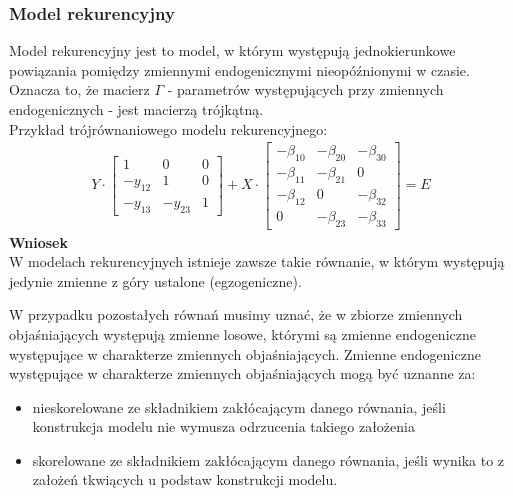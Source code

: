 \subsubsection{Model rekurencyjny}
Model rekurencyjny jest to model, w którym występują jednokierunkowe powiązania pomiędzy zmiennymi endogenicznymi nieopóźnionymi w czasie. Oznacza to, że macierz $ \Gamma $ - parametrów występujących przy zmiennych endogenicznych - jest macierzą trójkątną.\\
Przykład trójrównaniowego modelu rekurencyjnego:
\begin{gather*}
Y\cdot
\begin{bmatrix}
	1       & 0       & 0 \\
	-y_{12} & 1       & 0 \\
	-y_{13} & -y_{23} & 1
\end{bmatrix}
+
X\cdot
\begin{bmatrix}
	-\beta _{10} & -\beta _{20} & -\beta _{30} \\
	-\beta _{11} & -\beta _{21} & 0            \\
	-\beta _{12} & 0            & -\beta _{32} \\
	0            & -\beta _{23} & -\beta _{33}
\end{bmatrix}
=E
\end{gather*}
\textbf{Wniosek}\\
W modelach rekurencyjnych istnieje zawsze takie równanie, w którym występują jedynie zmienne z góry ustalone (egzogeniczne).

W przypadku pozostałych równań musimy uznać, że w zbiorze zmiennych objaśniających występują zmienne losowe, którymi są zmienne endogeniczne występujące w charakterze zmiennych objaśniających. Zmienne endogeniczne występujące w charakterze zmiennych objaśniających mogą być uznanne za:
\begin{itemize}
\item nieskorelowane ze składnikiem zakłócającym danego równania, jeśli konstrukcja modelu nie wymusza odrzucenia takiego założenia
\item skorelowane ze składnikiem zakłócającym danego równania, jeśli wynika to z założeń tkwiących u podstaw konstrukcji modelu.
\end{itemize}

